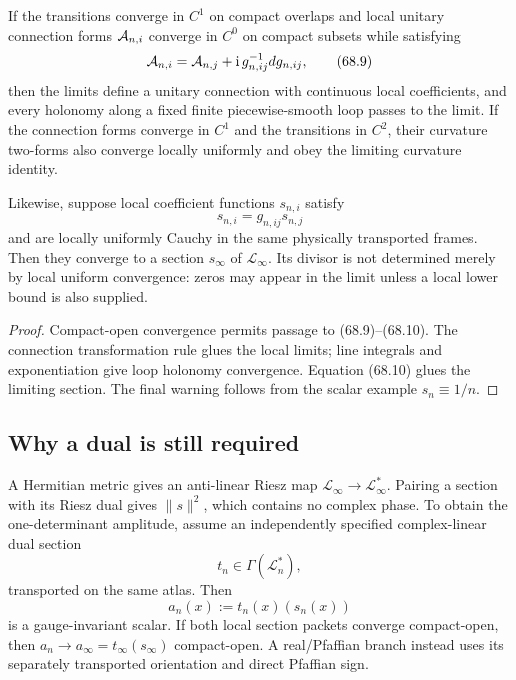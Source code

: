 \documentclass[11pt]{article}
\theoremstyle{remark}
\begin{document}
If the transitions converge in \(C^1\) on compact overlaps and local
unitary connection forms \({\cal A}_{n,i}\) converge in \(C^0\) on
compact subsets while satisfying
\begin{equation}
 {\cal A}_{n,i}
 =
 {\cal A}_{n,j}
 +{\rm i}\,g_{n,ij}^{-1}dg_{n,ij},                \tag{68.9}
\end{equation}
then the limits define a unitary connection with continuous local
coefficients, and every holonomy along a fixed finite
piecewise-smooth loop passes to the limit.  If the connection forms
converge in \(C^1\) and the transitions in \(C^2\), their curvature
two-forms also converge locally uniformly and obey the limiting
curvature identity.

Likewise, suppose local coefficient functions \(s_{n,i}\) satisfy
\begin{equation}
                         s_{n,i}=g_{n,ij}s_{n,j}  \tag{68.10}
\end{equation}
and are locally uniformly Cauchy in the same physically transported
frames.  Then they converge to a section \(s_\infty\) of
\(\mathscr L_\infty\).  Its divisor is not determined merely by
local uniform convergence: zeros may appear in the limit unless a
local lower bound is also supplied.

\begin{proof}
Compact-open convergence permits passage to (68.9)--(68.10).
The connection transformation rule glues the local limits; line
integrals and exponentiation give loop holonomy convergence.
Equation (68.10) glues the limiting section.  The final warning
follows from the scalar example \(s_n\equiv1/n\).
\end{proof}

\subsection{Why a dual is still required}

A Hermitian metric gives an anti-linear Riesz map
\(\mathscr L_\infty\to\mathscr L_\infty^*\).  Pairing a section with
its Riesz dual gives \(\|s\|^2\), which contains no complex phase.
To obtain the one-determinant amplitude, assume an independently
specified complex-linear dual section
\begin{equation}
 t_n\in\Gamma(\mathscr L_n^*),                    \tag{68.11}
\end{equation}
transported on the same atlas.  Then
\begin{equation}
                         a_n(x):=t_n(x)(s_n(x))   \tag{68.12}
\end{equation}
is a gauge-invariant scalar.  If both local section packets converge
compact-open, then \(a_n\to a_\infty=t_\infty(s_\infty)\)
compact-open.  A real/Pfaffian branch instead uses its separately
transported orientation and direct Pfaffian sign.
\end{document}
